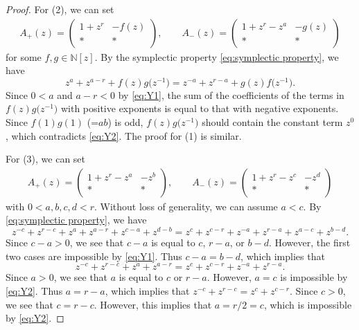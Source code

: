 \documentclass[pdftex]{sigma}
\numberwithin{equation}{section}
\theoremstyle{definition}
\begin{document}
\begin{proof}
 For (2), we can set
 \begin{align*}
 A_+(z) =
 \begin{pmatrix}
 1 + z^r & -f(z) \\
 * & *
 \end{pmatrix},\qquad
 A_-(z) =
 \begin{pmatrix}
 1 + z^r - z^a & -g(z) \\
 * & *
 \end{pmatrix}
 \end{align*}
 for some $f, g \in \mathbb{N}[z]$.
 By the symplectic property \eqref{eq:symplectic property}, we have
 \[
 z^a + z^{a - r} + f(z) g\bigl(z^{-1}\bigr) =
 z^{-a} + z^{r-a} + g(z) f\bigl(z^{-1}\bigr).
 \]
 Since $0 < a$ and $a-r<0$ by \eqref{eq:Y1},
 the sum of the coefficients of the terms in $f(z)g\bigl(z^{-1}\bigr)$ with positive exponents
 is equal to that with negative exponents.
 Since $f(1) g(1)$ (=$ab$) is odd, $f(z) g\bigl(z^{-1}\bigr)$ should contain the constant term $z^0$,
 which contradicts \eqref{eq:Y2}.
 The proof for (1) is similar.

 For (3), we can set
 \begin{align*}
 A_+(z) =
 \begin{pmatrix}
 1 + z^r - z^a & -z^b \\
 * & *
 \end{pmatrix},\qquad
 A_-(z) =
 \begin{pmatrix}
 1 + z^r - z^c & -z^d \\
 * & *
 \end{pmatrix}
 \end{align*}
 with $0< a,b,c,d < r$.
 Without loss of generality, we can assume $a<c$.
 By \eqref{eq:symplectic property}, we have
 \begin{equation*}
 z^{-c} + z^{r-c} + z^a + z^{a-r} + z^{c-a} + z^{d-b}
 = z^{c} + z^{c-r} + z^{-a} + z^{r-a} + z^{a-c} + z^{b-d}.
 \end{equation*}
 Since $c - a > 0$, we see that $c - a$ is equal to $c$, $r-a$, or $b-d$.
 However, the first two cases are impossible by \eqref{eq:Y1}.
 Thus $c - a = b - d$, which implies that
 \begin{equation*}
 z^{-c} + z^{r-c} + z^a + z^{a-r}
 = z^{c} + z^{c-r} + z^{-a} + z^{r-a}.
 \end{equation*}
 Since $a > 0$, we see that $a$ is equal to $c$ or $r-a$.
 However, $a = c$ is impossible by \eqref{eq:Y2}.
 Thus $a = r-a$, which implies that
$
 z^{-c} + z^{r-c}
 = z^{c} + z^{c-r}$.
 Since $c > 0$, we see that $c = r -c$.
 However, this implies that $a = r/2 = c$, which is impossible by \eqref{eq:Y2}.


\end{proof}
\end{document}
